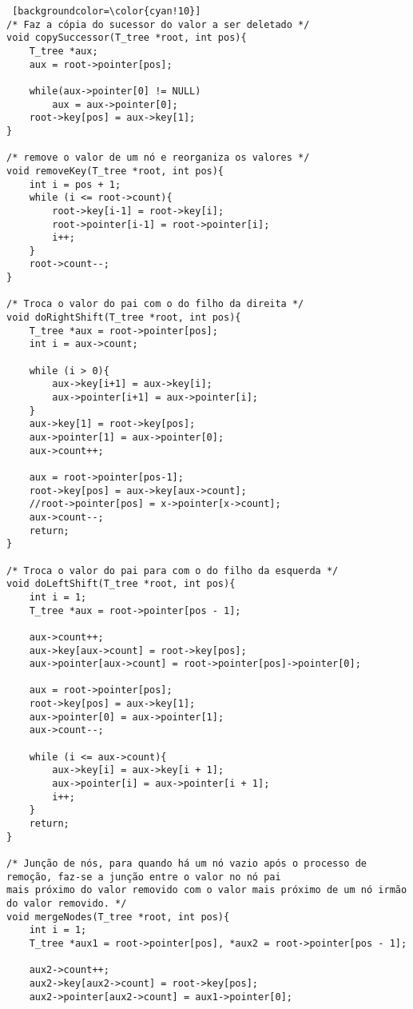 \documentclass[report]{uftex}
\begin{document}
\begin{lstlisting} [backgroundcolor=\color{cyan!10}]
/* Faz a cópia do sucessor do valor a ser deletado */
void copySuccessor(T_tree *root, int pos){
    T_tree *aux;
    aux = root->pointer[pos];

    while(aux->pointer[0] != NULL)
        aux = aux->pointer[0];
    root->key[pos] = aux->key[1];
}

/* remove o valor de um nó e reorganiza os valores */
void removeKey(T_tree *root, int pos){
    int i = pos + 1;
    while (i <= root->count){
        root->key[i-1] = root->key[i];
        root->pointer[i-1] = root->pointer[i];
        i++;
    }
    root->count--;
}

/* Troca o valor do pai com o do filho da direita */
void doRightShift(T_tree *root, int pos){
    T_tree *aux = root->pointer[pos];
    int i = aux->count;

    while (i > 0){
        aux->key[i+1] = aux->key[i];
        aux->pointer[i+1] = aux->pointer[i];
    }
    aux->key[1] = root->key[pos];
    aux->pointer[1] = aux->pointer[0];
    aux->count++;

    aux = root->pointer[pos-1];
    root->key[pos] = aux->key[aux->count];
    //root->pointer[pos] = x->pointer[x->count];
    aux->count--;
    return;
}

/* Troca o valor do pai para com o do filho da esquerda */
void doLeftShift(T_tree *root, int pos){
    int i = 1;
    T_tree *aux = root->pointer[pos - 1];

    aux->count++;
    aux->key[aux->count] = root->key[pos];
    aux->pointer[aux->count] = root->pointer[pos]->pointer[0];

    aux = root->pointer[pos];
    root->key[pos] = aux->key[1];
    aux->pointer[0] = aux->pointer[1];
    aux->count--;

    while (i <= aux->count){
        aux->key[i] = aux->key[i + 1];
        aux->pointer[i] = aux->pointer[i + 1];
        i++;
    }
    return;
}

/* Junção de nós, para quando há um nó vazio após o processo de remoção, faz-se a junção entre o valor no nó pai
mais próximo do valor removido com o valor mais próximo de um nó irmão do valor removido. */
void mergeNodes(T_tree *root, int pos){
    int i = 1;
    T_tree *aux1 = root->pointer[pos], *aux2 = root->pointer[pos - 1];

    aux2->count++;
    aux2->key[aux2->count] = root->key[pos];
    aux2->pointer[aux2->count] = aux1->pointer[0];


\end{lstlisting}
\end{document}
